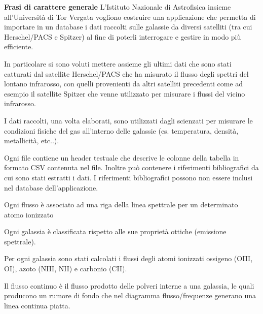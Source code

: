 \documentclass[12pt,a4paper,onecolumn,x11names]{article}
\begin{document}
	\begin{framed}
		\begin{flushleft}
			\textbf{Frasi di carattere generale}\newline
			L’Istituto Nazionale di Astrofisica insieme all’Università di Tor Vergata vogliono costruire una applicazione che permetta di importare in un database i dati raccolti sulle galassie da diversi satelliti (tra cui Herschel/PACS e Spitzer) al fine di poterli interrogare e gestire in modo più efficiente.\newline
			
			In particolare si sono voluti mettere assieme gli ultimi dati che sono stati catturati dal satellite Herschel/PACS che ha misurato il flusso degli spettri del lontano infrarosso, con quelli provenienti da altri satelliti precedenti come ad esempio il satellite Spitzer che venne utilizzato per misurare i flussi del vicino infrarosso.\newline
			
			I dati raccolti, una volta elaborati, sono utilizzati dagli scienzati per misurare le condizioni fisiche del gas all’interno delle galassie (es. temperatura, densità, metallicità, etc..).\newline
			
			Ogni file contiene un header testuale che descrive le colonne della tabella in formato CSV contenuta nel file. Inoltre può contenere i riferimenti bibliografici da cui sono stati estratti i dati. I riferimenti bibliografici possono non essere inclusi nel database dell'applicazione.\newline
			
			Ogni flusso è associato ad una riga della linea spettrale per un determinato atomo ionizzato\newline
			
			Ogni galassia è classificata rispetto alle sue proprietà ottiche (emissione spettrale).\newline
			
			Per ogni galassia sono stati calcolati i flussi degli atomi ionizzati ossigeno (OIII, OI), azoto (NIII, NII) e carbonio (CII).\newline
			
			Il flusso continuo è il flusso prodotto delle polveri interne a una galassia, le quali producono un rumore di fondo che nel diagramma flusso/frequenze generano una linea continua piatta.
		\end{flushleft}
	\end{framed}
\end{document}
